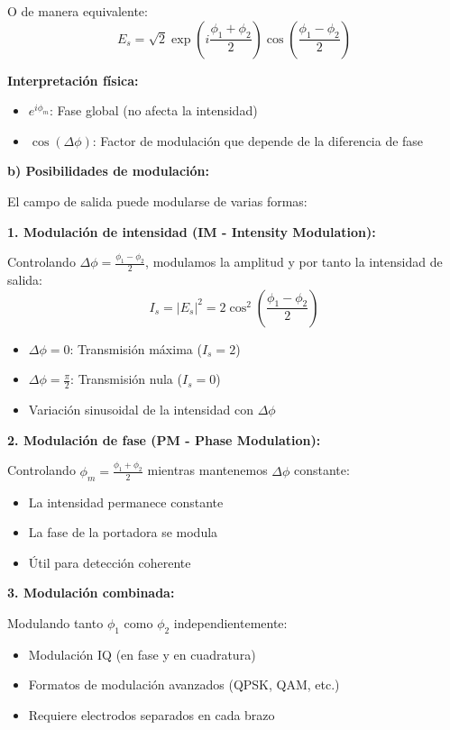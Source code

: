 \documentclass[12pt,a4paper]{article}
\begin{document}
O de manera equivalente:
\begin{equation}
    \boxed{E_s = \sqrt{2} \exp\left(i\frac{\phi_1 + \phi_2}{2}\right) \cos\left(\frac{\phi_1 - \phi_2}{2}\right)}
\end{equation}

\textbf{Interpretación física:}

\begin{itemize}
    \item $e^{i\phi_m}$: Fase global (no afecta la intensidad)
    \item $\cos(\Delta\phi)$: Factor de modulación que depende de la diferencia de fase
\end{itemize}

\textbf{b) Posibilidades de modulación:}

El campo de salida puede modularse de varias formas:

\textbf{1. Modulación de intensidad (IM - Intensity Modulation):}

Controlando $\Delta\phi = \frac{\phi_1 - \phi_2}{2}$, modulamos la amplitud y por tanto la intensidad de salida:
\begin{equation}
    I_s = |E_s|^2 = 2\cos^2\left(\frac{\phi_1 - \phi_2}{2}\right)
\end{equation}

\begin{itemize}
    \item $\Delta\phi = 0$: Transmisión máxima ($I_s = 2$)
    \item $\Delta\phi = \frac{\pi}{2}$: Transmisión nula ($I_s = 0$)
    \item Variación sinusoidal de la intensidad con $\Delta\phi$
\end{itemize}

\textbf{2. Modulación de fase (PM - Phase Modulation):}

Controlando $\phi_m = \frac{\phi_1 + \phi_2}{2}$ mientras mantenemos $\Delta\phi$ constante:
\begin{itemize}
    \item La intensidad permanece constante
    \item La fase de la portadora se modula
    \item Útil para detección coherente
\end{itemize}

\textbf{3. Modulación combinada:}

Modulando tanto $\phi_1$ como $\phi_2$ independientemente:
\begin{itemize}
    \item Modulación IQ (en fase y en cuadratura)
    \item Formatos de modulación avanzados (QPSK, QAM, etc.)
    \item Requiere electrodos separados en cada brazo
\end{itemize}
\end{document}
